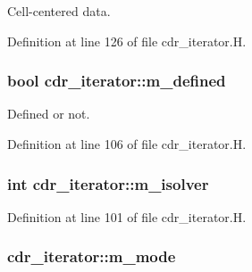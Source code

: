 Cell-\/centered data. 



Definition at line 126 of file cdr\+\_\+iterator.\+H.

\subsubsection[{\texorpdfstring{m\+\_\+defined}{m_defined}}]{\setlength{\rightskip}{0pt plus 5cm}bool cdr\+\_\+iterator\+::m\+\_\+defined\hspace{0.3cm}{\ttfamily [protected]}}\hypertarget{classcdr__iterator_ae1109228ca97e56c0a2a3416b684d459}{}\label{classcdr__iterator_ae1109228ca97e56c0a2a3416b684d459}


Defined or not. 



Definition at line 106 of file cdr\+\_\+iterator.\+H.

\subsubsection[{\texorpdfstring{m\+\_\+isolver}{m_isolver}}]{\setlength{\rightskip}{0pt plus 5cm}int cdr\+\_\+iterator\+::m\+\_\+isolver\hspace{0.3cm}{\ttfamily [protected]}}\hypertarget{classcdr__iterator_a3719b8b718d18a0abfd9ef402a61ab63}{}\label{classcdr__iterator_a3719b8b718d18a0abfd9ef402a61ab63}


Definition at line 101 of file cdr\+\_\+iterator.\+H.

\subsubsection[{\texorpdfstring{m\+\_\+mode}{m_mode}}]{ cdr\+\_\+iterator\+::m\+\_\+mode\hspace{0.3cm}{\ttfamily [protected]}}\hypertarget{classcdr__iterator_a22a13dbd5020936b417c7db7f597b5e4}{}\label{classcdr__iterator_a22a13dbd5020936b417c7db7f597b5e4}


